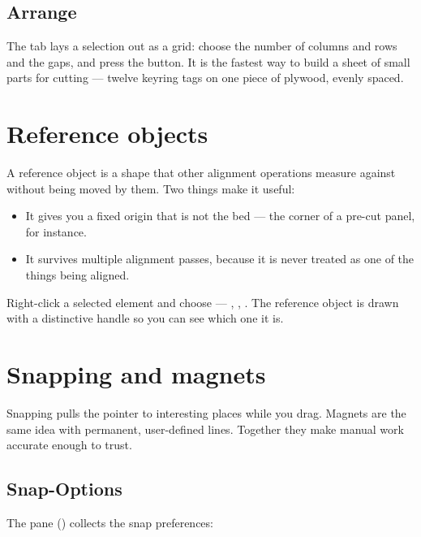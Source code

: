 \subsection*{Arrange}

The  tab lays a selection out as a grid: choose the number of
columns and rows and the gaps, and press the button. It is the fastest way to
build a sheet of small parts for cutting --- twelve keyring tags on one piece of
plywood, evenly spaced.

\section{Reference objects}

A reference object is a shape that other alignment operations measure against
without being moved by them. Two things make it useful:

\begin{itemize}
  \item It gives you a fixed origin that is not the bed --- the corner of a
        pre-cut panel, for instance.
  \item It survives multiple alignment passes, because it is never treated as one
        of the things being aligned.
\end{itemize}

\noindent Right-click a selected element and choose  ---
, ,
. The reference object is drawn with a distinctive
handle so you can see which one it is.

\section{Snapping and magnets}

Snapping pulls the pointer to interesting places while you drag. Magnets are the
same idea with permanent, user-defined lines. Together they make manual work
accurate enough to trust.

\subsection*{Snap-Options}

The  pane () collects the
snap preferences:

